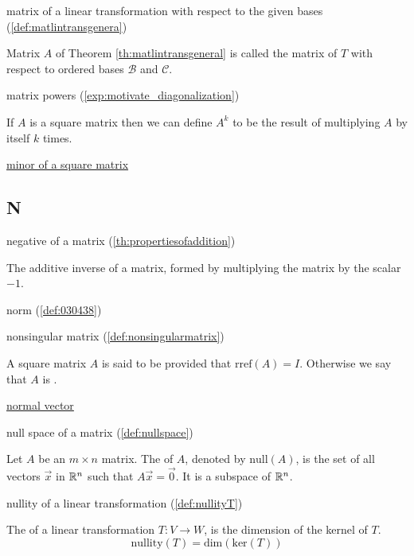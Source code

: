 \documentclass{ximera}
\begin{document}
matrix of a linear transformation with respect to the given bases (\ref{def:matlintransgenera})
\begin{expandable}
    Matrix $A$ of Theorem \ref{th:matlintransgeneral} is called the matrix of $T$ with respect to ordered bases $\mathcal{B}$ and $\mathcal{C}$.
\end{expandable}

matrix powers (\ref{exp:motivate_diagonalization})
\begin{expandable}
    If $A$ is a square matrix then we can define $A^k$ to be the result of multiplying $A$ by itself $k$ times.
\end{expandable}

\href{https://ximera.osu.edu/oerlinalg/LinearAlgebra/DET-0010/main}{minor of a square matrix}

\subsection*{N}

negative of a matrix
(\ref{th:propertiesofaddition})
\begin{expandable}
    The additive inverse of a matrix, formed by multiplying the matrix by the scalar $-1$.
\end{expandable}


norm (\ref{def:030438})


nonsingular matrix (\ref{def:nonsingularmatrix})
\begin{expandable}
    A square matrix $A$ is said to be  provided that $\mbox{rref}(A)=I$.  Otherwise we say that $A$ is .
\end{expandable}

\href{https://ximera.osu.edu/oerlinalg/LinearAlgebra/RRN-0030/main}{normal vector}

null space of a matrix (\ref{def:nullspace})
\begin{expandable}
    Let $A$ be an $m\times n$ matrix.  The  of $A$, denoted by $\mbox{null}(A)$, is the set of all vectors $\vec{x}$ in $\mathbb{R}^n$ such that $A\vec{x}=\vec{0}$.   
    It is a subspace of $\mathbb{R}^n$.
\end{expandable}

nullity of a linear transformation (\ref{def:nullityT})
\begin{expandable}
    The  of a linear transformation $T:V\rightarrow W$, is the dimension of the kernel of $T$.
$$\mbox{nullity}(T)=\mbox{dim}(\mbox{ker}(T))$$
\end{expandable}
\end{document}
